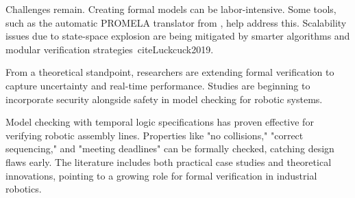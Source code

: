 Challenges remain. Creating formal models can be labor-intensive. 
Some tools, such as the automatic PROMELA translator from \cite{Weissmann2011},
help address this. Scalability issues due to state-space explosion are 
being mitigated by smarter algorithms and modular verification strategies\
cite{Luckcuck2019}.

From a theoretical standpoint, researchers are extending formal verification 
to capture uncertainty and real-time performance. Studies are beginning to 
incorporate security alongside safety in model checking for robotic systems.

Model checking with temporal logic specifications has proven effective for 
verifying robotic assembly lines. Properties like "no collisions," 
"correct sequencing," and "meeting deadlines" can be formally checked, 
catching design flaws early. The literature includes both practical case 
studies and theoretical innovations, pointing to a growing role for 
formal verification in industrial robotics.

